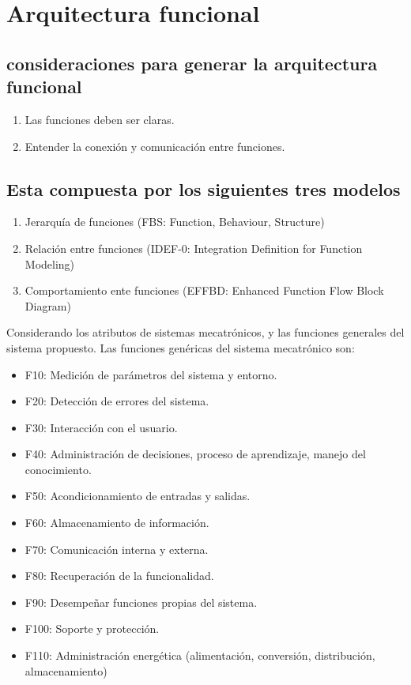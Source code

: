 \section{Arquitectura funcional}

\subsection{consideraciones para generar la arquitectura funcional}
\begin{enumerate}
    \item Las funciones deben ser claras.
    \item Entender la conexión y comunicación entre funciones. 
\end{enumerate}

\subsection{Esta compuesta por los siguientes tres modelos}
\begin{enumerate}
    \item Jerarquía de funciones (FBS: Function, Behaviour, Structure)
    \item Relación entre funciones (IDEF-0: Integration Definition for Function Modeling)
    \item Comportamiento ente funciones (EFFBD: Enhanced Function Flow Block Diagram)
\end{enumerate}

Considerando los atributos de sistemas mecatrónicos, y las funciones generales del sistema propuesto. Las funciones genéricas del sistema mecatrónico son:
\begin{itemize}
    \item F10: Medición de parámetros del sistema y entorno.
    \item F20: Detección de errores del sistema.
    \item F30: Interacción con el usuario.
    \item F40: Administración de decisiones, proceso de aprendizaje, manejo del conocimiento.
    \item F50: Acondicionamiento de entradas y salidas.
    \item F60: Almacenamiento de información.
    \item F70: Comunicación interna y externa.
    \item F80: Recuperación de la funcionalidad.
    \item F90: Desempeñar funciones propias del sistema.
    \item F100: Soporte y protección.
    \item F110: Administración energética (alimentación, conversión, distribución, almacenamiento)
\end{itemize}

